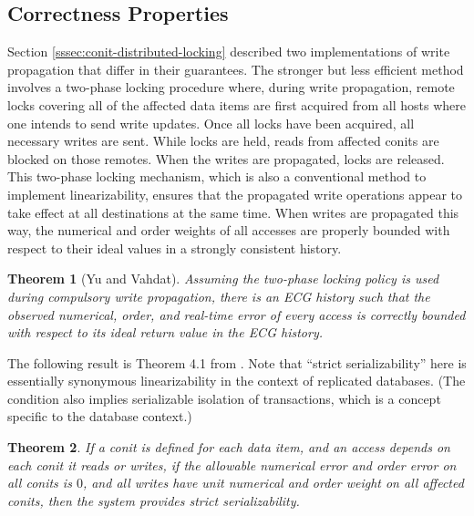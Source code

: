 \documentclass[]             %
{NASA}                       %
\newtheorem{theorem}{Theorem}[section]
\theoremstyle{definition}
\begin{document}
\subsection{Correctness Properties}
\label{ssec:conit-correctness}
Section \ref{sssec:conit-distributed-locking} described two
implementations of write propagation that differ in their
guarantees. The stronger but less efficient method involves a
two-phase locking procedure where, during write propagation, remote
locks covering all of the affected data items are first acquired from
all hosts where one intends to send write updates. Once all locks have
been acquired, all necessary writes are sent. While locks are held,
reads from affected conits are blocked on those remotes. When the
writes are propagated, locks are released. This two-phase locking
mechanism, which is also a conventional method to implement
linearizability, ensures that the propagated write operations appear
to take effect at all destinations at the same time. When writes are
propagated this way, the numerical and order weights of all accesses
are properly bounded with respect to their ideal values in a strongly
consistent history.
\begin{theorem}[Yu and Vahdat]
  \label{thm:conit-correct}
  Assuming the two-phase locking policy is used during compulsory
  write propagation, there is an ECG history such that the observed
  numerical, order, and real-time error of every access is correctly
  bounded with respect to its ideal return value in the ECG history.
\end{theorem}

The following result is Theorem 4.1 from \cite{2002tact}. Note that
``strict serializability'' here is essentially synonymous
linearizability in the context of replicated databases. (The condition
also implies serializable isolation of transactions, which is a
concept specific to the database context.)
\begin{theorem}
  \label{thm:conit-correct-linearizability}
  If a conit is defined for each data item, and an access depends on
  each conit it reads or writes, if the allowable numerical error and
  order error on all conits is $0$, and all writes have unit numerical
  and order weight on all affected conits, then the system provides
  strict serializability.
\end{theorem}

\end{document}
